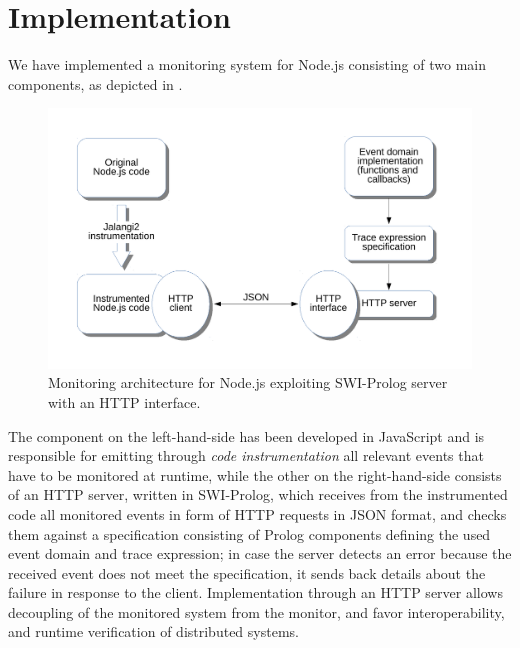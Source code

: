 \section{Implementation}
\label{sec:impl}
We have implemented a monitoring system for Node.js consisting of two main components, as depicted in .

\begin{figure}
\centering\includegraphics[width=.8\textwidth]{fig/architecture}
\caption{Monitoring architecture for Node.js exploiting SWI-Prolog server with an HTTP interface.}
\label{fig:arch}
\end{figure}

The component on the left-hand-side has been developed in JavaScript and is responsible for emitting through \emph{code instrumentation} all relevant events that have to be monitored
at runtime, while the other on the right-hand-side consists of an HTTP server, written in SWI-Prolog, which receives from the instrumented code all monitored events in form of HTTP requests in JSON format, and checks them against a specification consisting of Prolog components defining the used event domain and trace expression; in case the server detects an error because the received event does not meet the specification, it sends back details about the failure in response to the client. Implementation through an HTTP server allows decoupling of the monitored system from the monitor, and
favor interoperability, and runtime verification of distributed systems.




